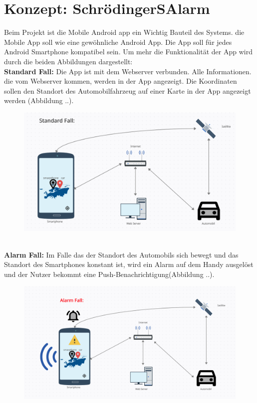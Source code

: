 \section{Konzept: SchrödingerSAlarm}
Beim Projekt ist die Mobile Android app ein Wichtig Bauteil des Systems.
die Mobile App soll wie eine gewöhnliche Android App. Die App soll für jedes Android Smartphone kompatibel sein. Um mehr die Funktionalität der App wird durch die beiden Abbildungen dargestellt:\\
\textbf{Standard Fall:} Die App ist mit dem Webserver verbunden. Alle Informationen. die vom Webserver kommen, werden in der App angezeigt. Die Koordinaten sollen den Standort des Automobilfahrzeug auf einer Karte in der App angezeigt werden (Abbildung ..).
\begin{figure}[t]
            \centering
            \includegraphics[width=1\textwidth]{Bilder/StandardFall.PNG}
    \end{figure}
\\\textbf{Alarm Fall:} Im Falle das der Standort des Automobils sich bewegt und das Standort des Smartphones konstant ist, wird ein Alarm auf dem Handy ausgelöst und der Nutzer bekommt eine Push-Benachrichtigung(Abbildung ..).
     \begin{figure}[t]
            \centering
            \includegraphics[width=1\textwidth]{Bilder/AlarmFall.PNG}
    \end{figure}
	

